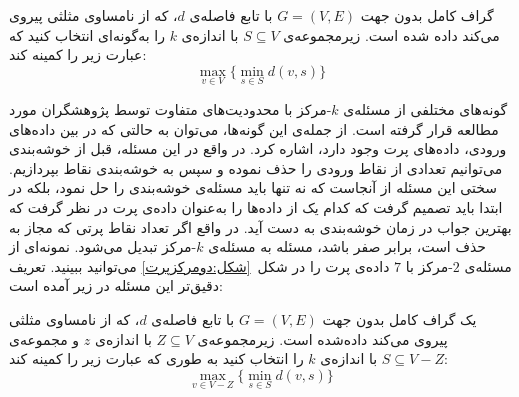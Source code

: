 \begin{شکل}[t]
\vspace{1em}
\end{شکل}

\begin{مسئله}
  گراف کامل بدون جهت $G = (V, E)$ با تابع فاصله‌ی $d$،
که از نامساوی مثلثی پیروی می‌کند داده ‌شده است.
زیرمجموعه‌ی $S \subseteq V$ با اندازه‌ی $k$ را به‌گونه‌ای انتخاب کنید که عبارت زیر را کمینه کند:
\begin{equation}
\max_{v \in V} \{ \min_{s \in S} d(v, s) \}
\end{equation}
\end{مسئله}

گونه‌های مختلفی از مسئله‌ی $k$-مرکز با محدودیت‌های متفاوت توسط پژوهشگران مورد مطالعه قرار گرفته است.
از جمله‌ی این گونه‌ها، می‌توان به حالتی که در بین داده‌های ورودی، داده‌های پرت وجود دارد، اشاره کرد.
در واقع در این مسئله، قبل از خوشه‌بندی می‌توانیم تعدادی از نقاط ورودی را حذف نموده و سپس به خوشه‌بندی نقاط بپردازیم.
سختی این مسئله از آنجاست که نه تنها باید مسئله‌ی خوشه‌بندی را حل نمود، بلکه در ابتدا باید تصمیم گرفت که کدام یک از داده‌ها را به‌عنوان داده‌ی پرت در نظر گرفت که بهترین جواب در زمان خوشه‌بندی به دست آید.
در واقع اگر تعداد نقاط پرتی که مجاز به حذف است، برابر صفر باشد، مسئله به مسئله‌ی $k$-مرکز تبدیل می‌شود.
نمونه‌ای از مسئله‌ی $2$-مرکز با $7$ داده‌ی پرت را در شکل~\ref{شکل:دومرکزپرت} می‌توانید ببینید.
تعریف دقیق‌تر این مسئله در زیر آمده است:

\begin{مسئله}
 یک گراف کامل بدون جهت $G = (V, E)$ با تابع فاصله‌ی $d$، که از نامساوی مثلثی پیروی می‌کند داده‌شده است.
زیرمجموعه‌ی $Z \subseteq V$ با اندازه‌ی $z$ و  مجموعه‌ی $S \subseteq V - Z$ با اندازه‌ی $k$ را انتخاب کنید به‌ طوری ‌که عبارت زیر را کمینه کند:
\begin{equation}
\max_{v \in V - Z} \{ \min_{s \in S} d(v, s) \}
\end{equation}
\end{مسئله}

\begin{شکل}[t]
\end{شکل}

